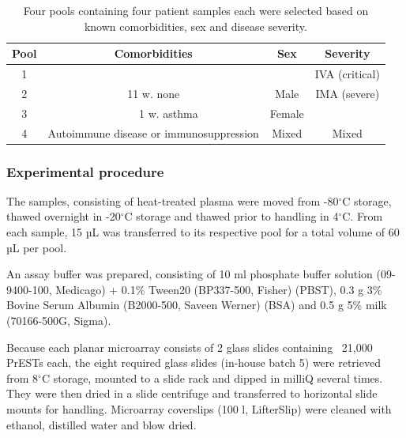 \documentclass{article}
\begin{document}
\begin{table}[H]
\caption{Four pools containing four patient samples each were selected based on known comorbidities, sex and disease severity.}
\label{42k_pools}
\begin{center}
{\renewcommand{\arraystretch}{1.2}
\begin{tabular}{|c|cc|c|c|}
\hline
\textbf{Pool} & \multicolumn{2}{c|}{\textbf{Comorbidities}} & \textbf{Sex} & \textbf{Severity} \\ \hline\hline
1 & \multicolumn{2}{c|}{\cellcolor[HTML]{A9D08E}} &  & IVA (critical) \\ \cline{1-1} \cline{5-5} 
2 & \multicolumn{2}{c|}{\multirow{-1}{*}{\cellcolor[HTML]{A9D08E}11 w. none}} & \multirow{-2}{*}{Male} & IMA (severe) \\ \cline{1-1} \cline{3-5} 
3 & \multicolumn{1}{p{140pt}}{\cellcolor[HTML]{A9D08E}} & \cellcolor[HTML]{FFD966}1 w. asthma & Female & \cellcolor[HTML]{D9D9D9} \\ \cline{1-4}
4 & \multicolumn{2}{c|}{\cellcolor[HTML]{F4B084}Autoimmune disease or immunosuppression} & \cellcolor[HTML]{D9D9D9}Mixed & \multirow{-2}{*}{\cellcolor[HTML]{D9D9D9}Mixed} \\ \hline
\end{tabular}
}
\end{center}
\end{table}

\subsubsection{Experimental procedure}
The samples, consisting of heat-treated plasma were moved from -80$^{\circ}$C storage, thawed overnight in -20$^{\circ}$C storage and thawed prior to handling in 4$^{\circ}$C. From each sample, 15 µL was transferred to its respective pool for a total volume of 60 µL per pool.

An assay buffer was prepared, consisting of 10 ml phosphate buffer solution (09-9400-100, Medicago) + 0.1\% Tween20 (BP337-500, Fisher) (PBST), 0.3 g 3\% Bovine Serum Albumin (B2000-500, Saveen Werner) (BSA) and 0.5 g 5\% milk (70166-500G, Sigma).

Because each planar microarray consists of 2 glass slides containing ~21,000 PrESTs each, the eight required glass slides (in-house batch 5) were retrieved from 8$^{\circ}$C storage, mounted to a slide rack and dipped in milliQ several times. They were then dried in a slide centrifuge and transferred to horizontal slide mounts for handling. Microarray coverslips (100 \textmu l, LifterSlip)  were cleaned with ethanol, distilled water and blow dried.
\end{document}
